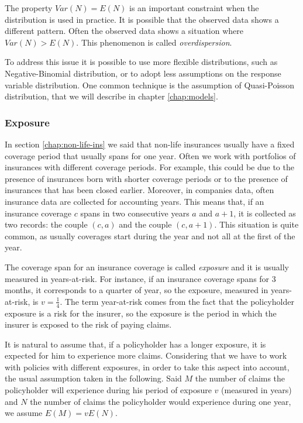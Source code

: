 \documentclass[a4paper, nobind]{templates/ociamthesis}
\theoremstyle{definition}
\theoremstyle{definition}
\theoremstyle{definition}
\theoremstyle{remark}
\begin{document}
The property \(Var(N) = E(N)\) is an important constraint when the distribution is used in practice. It is possible that the observed data shows a different pattern. Often the observed data shows a situation where \(Var(N) > E(N)\). This phenomenon is called \emph{overdispersion}.

To address this issue it is possible to use more flexible distributions, such as Negative-Binomial distribution, or to adopt less assumptions on the response variable distribution. One common technique is the assumption of Quasi-Poisson distribution, that we will describe in chapter \ref{chap:models}.

\hypertarget{chap:exposure}{%
\subsubsection{Exposure}\label{chap:exposure}}

In section \ref{chap:non-life-ins} we said that non-life insurances usually have a fixed coverage period that usually spans for one year. Often we work with portfolios of insurances with different coverage periods. For example, this could be due to the presence of insurances born with shorter coverage periods or to the presence of insurances that has been closed earlier. Moreover, in companies data, often insurance data are collected for accounting years. This means that, if an insurance coverage \(c\) spans in two consecutive years \(a\) and \(a+1\), it is collected as two records: the couple \((c, a)\) and the couple \((c, a+1)\). This situation is quite common, as usually coverages start during the year and not all at the first of the year.

The coverage span for an insurance coverage is called \emph{exposure} and it is usually measured in years-at-risk. For instance, if an insurance coverage spans for 3 months, it corresponds to a quarter of year, so the exposure, measured in years-at-risk, is \(v=\frac{1}{4}\). The term year-at-risk comes from the fact that the policyholder exposure is a risk for the insurer, so the exposure is the period in which the insurer is exposed to the risk of paying claims.

It is natural to assume that, if a policyholder has a longer exposure, it is expected for him to experience more claims. Considering that we have to work with policies with different exposures, in order to take this aspect into account, the usual assumption taken in the following. Said \(M\) the number of claims the policyholder will experience during his period of exposure \(v\) (measured in years) and \(N\) the number of claims the policyholder would experience during one year, we assume \(E(M) = v E(N)\).
\end{document}
